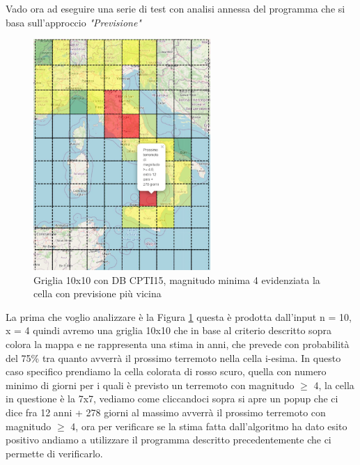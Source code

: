 Vado ora ad eseguire una serie di test con analisi annessa del programma che si basa sull'approccio \textit{"Previsione"}

\begin{figure}[H]
   \centering
   \includegraphics[width=0.600\textwidth]{images/10x10_mag4_12anniEvidenziato_CPTI15.jpg}
   \caption{Griglia 10x10 con DB CPTI15, magnitudo minima 4 evidenziata la cella con previsione pi\`u vicina}
   \label{fig:10x10_mag4_12anniEvidenziato}
\end{figure}

La prima che voglio analizzare \`e la Figura \ref{fig:10x10_mag4_12anniEvidenziato} questa \`e prodotta dall'input n = 10, x = 4 quindi avremo una griglia 10x10 che in base al criterio descritto sopra colora la mappa e ne rappresenta una stima in anni, che prevede con probabilit\`a del 75\% tra quanto avverr\`a il prossimo terremoto nella cella i-esima. In questo caso specifico prendiamo la cella colorata di rosso scuro, quella con numero minimo di giorni per i quali \`e previsto un terremoto con magnitudo $\ge$ 4, la cella in questione \`e la 7x7, vediamo come cliccandoci sopra si apre un popup che ci dice fra 12 anni + 278 giorni al massimo avverr\`a il prossimo terremoto con magnitudo $\ge$ 4, ora per verificare se la stima fatta dall'algoritmo ha dato esito positivo andiamo a utilizzare il programma descritto precedentemente che ci permette di verificarlo.


